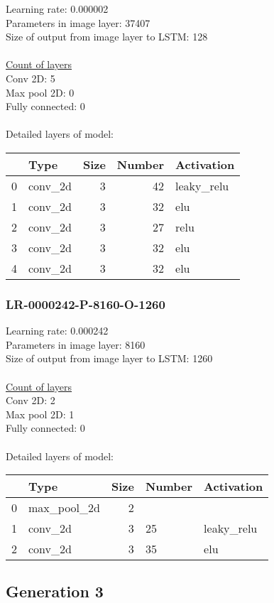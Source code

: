 Learning rate: 0.000002
\\Parameters in image layer: 37407
\\Size of output from image layer to LSTM: 128
\\\\\underline{Count of layers} 
\\Conv 2D:           5\\Max pool 2D:      0\\Fully connected:  0
\\\\Detailed layers of model: \\\begin{tabular}{rlrrl}
\hline
    & Type    &   Size &   Number & Activation   \\
\hline
  0 & conv\_2d &      3 &       42 & leaky\_relu   \\
  1 & conv\_2d &      3 &       32 & elu          \\
  2 & conv\_2d &      3 &       27 & relu         \\
  3 & conv\_2d &      3 &       32 & elu          \\
  4 & conv\_2d &      3 &       32 & elu          \\
\hline
\end{tabular}\subsubsection*{LR-0000242-P-8160-O-1260}
Learning rate: 0.000242
\\Parameters in image layer: 8160
\\Size of output from image layer to LSTM: 1260
\\\\\underline{Count of layers} 
\\Conv 2D:           2\\Max pool 2D:      1\\Fully connected:  0
\\\\Detailed layers of model: \\\begin{tabular}{rlrll}
\hline
    & Type        &   Size & Number   & Activation   \\
\hline
  0 & max\_pool\_2d &      2 &          &              \\
  1 & conv\_2d     &      3 & 25       & leaky\_relu   \\
  2 & conv\_2d     &      3 & 35       & elu          \\
\hline
\end{tabular}\subsection{Generation 3}
